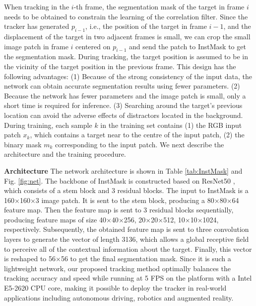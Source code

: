 \documentclass[review]{elsarticle}
\begin{document}
\begin{CJK*}{UTF8}{gbsn}
When tracking in the $i$-th frame, the segmentation mask of the target in frame $i$ needs to be obtained to constrain the learning of the correlation filter. Since the tracker has generated $p_{i-1}$, i.e., the position of the target in frame $i-1$, and the displacement of the target in two adjacent frames is small, we can crop the small image patch in frame $i$ centered on $p_{i-1}$ and send the patch to InstMask to get the segmentation mask.
During tracking, the target position is assumed to be in the vicinity of the target position in the previous frame.
This design has the following advantages: (1) Because of the strong consistency of the input data, the network can obtain accurate segmentation results using fewer parameters. (2) Because the network has fewer parameters and the image patch is small, only a short time is required for inference. (3) Searching around the target's previous location can avoid the adverse effects of distractors located in the background. During training, each sample $k$ in the training set contains (1) the RGB input patch $x_k$, which contains a target near to the centre of the input patch, (2) the binary mask $m_{k}$ corresponding to the input patch.
We next describe the architecture and the training procedure.

\textbf{Architecture} The network architecture is shown in Table \ref{tab:InstMask} and Fig. \ref{fig:net}. The backbone of InstMask is constructed based on ResNet50 \cite{He2016DeepRL}, which consists of a stem block and 3 residual blocks.
The input to InstMask is a 160$\times$160$\times$3 image patch. It is sent to the stem block, producing a 80$\times$80$\times$64 feature map. Then the feature map is sent to 3 residual blocks sequentially, producing feature maps of size 40$\times$40$\times$256, 20$\times$20$\times$512, 10$\times$10$\times$1024, respectively. Subsequently, the obtained feature map is sent to three convolution layers to generate the vector of length 3136, which allows a global receptive field to perceive all of the contextual information about the target. Finally, this vector is reshaped to 56$\times$56 to get the final segmentation mask. Since it is such a lightweight network, our proposed tracking method optimally balances the tracking accuracy and speed while running at 5 FPS on the platform with a Intel E5-2620 CPU core, making it possible to deploy the tracker in real-world applications including autonomous driving, robotics and augmented reality.


\end{CJK*}
\end{document}
